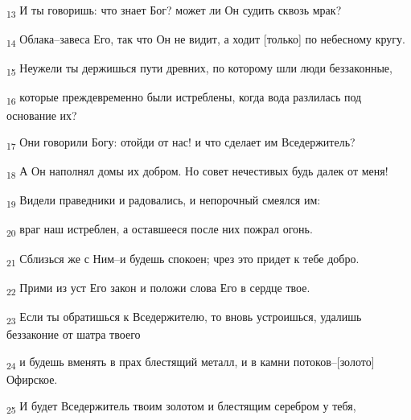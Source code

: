 \begin{tcolorbox}
\textsubscript{13} И ты говоришь: что знает Бог? может ли Он судить сквозь мрак?
\end{tcolorbox}
\begin{tcolorbox}
\textsubscript{14} Облака--завеса Его, так что Он не видит, а ходит [только] по небесному кругу.
\end{tcolorbox}
\begin{tcolorbox}
\textsubscript{15} Неужели ты держишься пути древних, по которому шли люди беззаконные,
\end{tcolorbox}
\begin{tcolorbox}
\textsubscript{16} которые преждевременно были истреблены, когда вода разлилась под основание их?
\end{tcolorbox}
\begin{tcolorbox}
\textsubscript{17} Они говорили Богу: отойди от нас! и что сделает им Вседержитель?
\end{tcolorbox}
\begin{tcolorbox}
\textsubscript{18} А Он наполнял домы их добром. Но совет нечестивых будь далек от меня!
\end{tcolorbox}
\begin{tcolorbox}
\textsubscript{19} Видели праведники и радовались, и непорочный смеялся им:
\end{tcolorbox}
\begin{tcolorbox}
\textsubscript{20} враг наш истреблен, а оставшееся после них пожрал огонь.
\end{tcolorbox}
\begin{tcolorbox}
\textsubscript{21} Сблизься же с Ним--и будешь спокоен; чрез это придет к тебе добро.
\end{tcolorbox}
\begin{tcolorbox}
\textsubscript{22} Прими из уст Его закон и положи слова Его в сердце твое.
\end{tcolorbox}
\begin{tcolorbox}
\textsubscript{23} Если ты обратишься к Вседержителю, то вновь устроишься, удалишь беззаконие от шатра твоего
\end{tcolorbox}
\begin{tcolorbox}
\textsubscript{24} и будешь вменять в прах блестящий металл, и в камни потоков--[золото] Офирское.
\end{tcolorbox}
\begin{tcolorbox}
\textsubscript{25} И будет Вседержитель твоим золотом и блестящим серебром у тебя,
\end{tcolorbox}

